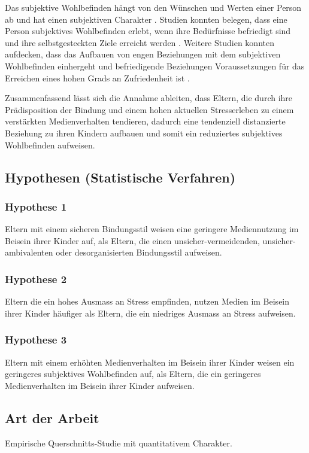 Das subjektive Wohlbefinden hängt von den Wünschen und Werten einer Person ab und hat einen subjektiven Charakter \cite{Odaci2014}. Studien konnten belegen, dass eine Person subjektives Wohlbefinden erlebt, wenn ihre Bedürfnisse befriedigt sind und ihre selbstgesteckten Ziele erreicht werden \cite{Diener1999}. Weitere Studien konnten aufdecken, dass das Aufbauen von engen Beziehungen mit dem subjektiven Wohlbefinden einhergeht \cite{Kasser1996} und befriedigende Beziehungen Voraussetzungen für das Erreichen eines hohen Grads an Zufriedenheit ist \cite{Celik2013}.

Zusammenfassend lässt sich die Annahme ableiten, dass Eltern, die durch ihre Prädisposition der Bindung und einem hohen aktuellen Stresserleben zu einem verstärkten Medienverhalten tendieren, dadurch eine tendenziell distanzierte Beziehung zu ihren Kindern aufbauen und somit ein reduziertes subjektives Wohlbefinden aufweisen.

\subsection{Hypothesen (Statistische Verfahren)}
\subsubsection{Hypothese 1}
Eltern mit einem sicheren Bindungsstil weisen eine geringere Mediennutzung im Beisein ihrer Kinder auf, als Eltern, die einen unsicher-vermeidenden, unsicher-ambivalenten oder desorganisierten Bindungsstil aufweisen.
\subsubsection{Hypothese 2}
Eltern die ein hohes Ausmass an Stress empfinden, nutzen Medien im Beisein ihrer Kinder häufiger als Eltern, die ein niedriges Ausmass an Stress aufweisen.
\subsubsection{Hypothese 3}
Eltern mit einem erhöhten Medienverhalten im Beisein ihrer Kinder weisen ein geringeres subjektives Wohlbefinden auf, als Eltern, die ein geringeres Medienverhalten im Beisein ihrer Kinder aufweisen.
\subsection{Art der Arbeit}
Empirische Querschnitts-Studie mit quantitativem Charakter.

